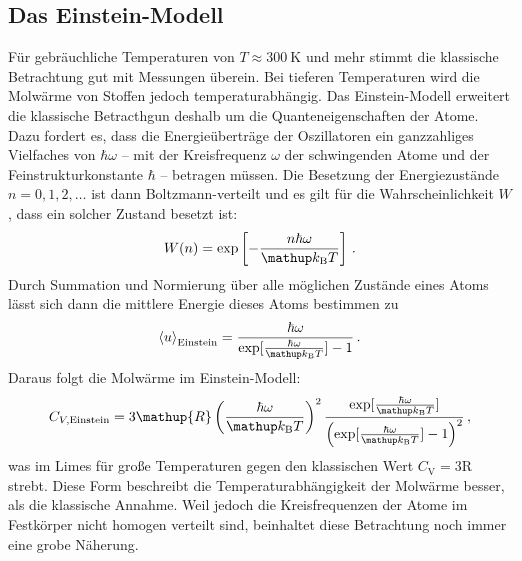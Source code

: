 \subsection{Das Einstein-Modell}
\label{subsec:einstein}
Für gebräuchliche Temperaturen von $T \approx \SI{300}{\kelvin}$ und mehr
stimmt die klassische Betrachtung gut mit Messungen überein.
Bei tieferen Temperaturen wird die Molwärme von Stoffen jedoch
temperaturabhängig.
Das Einstein-Modell erweitert die klassische Betracthgun deshalb um die
Quanteneigenschaften der Atome. Dazu fordert es, dass die Energieüberträge
der Oszillatoren ein ganzzahliges Vielfaches von $\hbar\omega$ -- mit
der Kreisfrequenz $\omega$ der schwingenden Atome und der
Feinstrukturkonstante $\hbar$ -- betragen müssen.
Die Besetzung der Energiezustände $n = 0,1,2,\dots$ ist dann Boltzmann-verteilt
und es gilt für die Wahrscheinlichkeit $W$, dass ein solcher Zustand besetzt
ist:
\begin{equation}
    \label{eqn:boltzmann}
    W(n) = \exp\left[-\frac{n\hbar\omega}{\kb T}\right]\,.
\end{equation}
Durch Summation und Normierung über alle möglichen Zustände eines Atoms
lässt sich dann die mittlere Energie dieses Atoms bestimmen zu
\begin{equation}
    \label{eqn:u_einstein}
    \left<u\right>_\text{Einstein} =
    \frac{\hbar\omega}{\exp[\frac{\hbar\omega}{\kb T}] - 1}\,.
\end{equation}
Daraus folgt die Molwärme im Einstein-Modell:
\begin{equation}
    \label{eqn:cv_einstein}
    C_{V,\text{Einstein}} =
    3\mathup{R}\left(\frac{\hbar\omega}{\kb T}\right)^2
    \frac{
        \exp[\frac{\hbar\omega}{\kb T}]
    }{
        \left(\exp[\frac{\hbar\omega}{\kb T}] - 1\right)^2
    }\,,
\end{equation}
was im Limes für große Temperaturen gegen den klassischen Wert
$C_\mathrm{V} = 3\mathup{R}$ strebt.
Diese Form beschreibt die Temperaturabhängigkeit der Molwärme besser, als
die klassische Annahme. Weil jedoch die Kreisfrequenzen der Atome im Festkörper
nicht homogen verteilt sind, beinhaltet diese Betrachtung noch immer eine grobe
Näherung.

